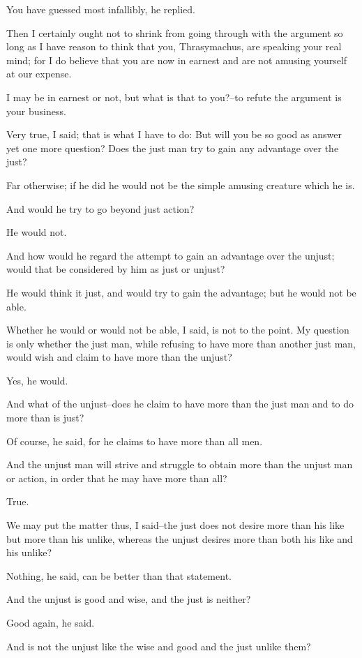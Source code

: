 You have guessed most infallibly, he replied.

Then I certainly ought not to shrink from going through with the
argument so long as I have reason to think that you, Thrasymachus, are
speaking your real mind; for I do believe that you are now in earnest
and are not amusing yourself at our expense.

I may be in earnest or not, but what is that to you?--to refute the
argument is your business.

Very true, I said; that is what I have to do: But will you be so good
as answer yet one more question? Does the just man try to gain any
advantage over the just?

Far otherwise; if he did he would not be the simple amusing creature
which he is.

And would he try to go beyond just action?

He would not.

And how would he regard the attempt to gain an advantage over the
unjust; would that be considered by him as just or unjust?

He would think it just, and would try to gain the advantage; but he
would not be able.

Whether he would or would not be able, I said, is not to the point. My
question is only whether the just man, while refusing to have more than
another just man, would wish and claim to have more than the unjust?

Yes, he would.

And what of the unjust--does he claim to have more than the just man and
to do more than is just?

Of course, he said, for he claims to have more than all men.

And the unjust man will strive and struggle to obtain more than the
unjust man or action, in order that he may have more than all?

True.

We may put the matter thus, I said--the just does not desire more than
his like but more than his unlike, whereas the unjust desires more than
both his like and his unlike?

Nothing, he said, can be better than that statement.

And the unjust is good and wise, and the just is neither?

Good again, he said.

And is not the unjust like the wise and good and the just unlike them?

